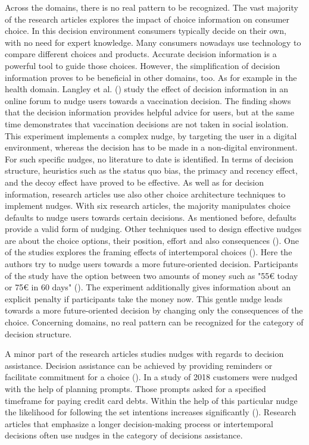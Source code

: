 Across the domains, there is no real pattern to be recognized. The vast majority of the research articles explores the impact of choice information on consumer choice. In this decision environment consumers typically decide on their own, with no need for expert knowledge. Many consumers nowadays use technology to compare different choices and products. Accurate decision information is a powerful tool to guide those choices. 
However, the simplification of decision information proves to be beneficial in other domains, too. As for example in the health domain. Langley et al. (\citeyear{langley_should_2015}) study the effect of decision information in an online forum to nudge users towards a vaccination decision. The finding shows that the decision information provides helpful advice for users, but at the same time demonstrates that vaccination decisions are not taken in social isolation. This experiment implements a complex nudge, by targeting the user in a digital environment, whereas the decision has to be made in a non-digital environment. For such specific nudges, no literature to date is identified.
In terms of decision structure, heuristics such as the status quo bias, the primacy and recency effect, and the decoy effect have proved to be effective. As well as for decision information, research articles use also other choice architecture techniques to implement nudges. With six research articles, the majority manipulates choice defaults to nudge users towards certain decisions. As mentioned before, defaults provide a valid form of nudging. Other techniques used to design effective nudges are about the choice options, their position, effort and also consequences (\cite{munscher_review_2016}). One of the studies explores the framing effects of intertemporal choices (\cite{faralla_framing_2017}). Here the authors try to nudge users towards a more future-oriented decision. Participants of the study have the option between two amounts of money such as "55€ today or 75€ in 60 days" (\cite[p.13]{faralla_framing_2017}). The experiment additionally gives information about an explicit penalty if participants take the money now. This gentle nudge leads towards a more future-oriented decision by changing only the consequences of the choice. Concerning domains, no real pattern can be recognized for the category of decision structure.

A minor part of the research articles studies nudges with regards to decision assistance. Decision assistance can be achieved by providing reminders or facilitate commitment for a choice (\cite{munscher_review_2016}). In a study of 2018 customers were nudged with the help of planning prompts. Those prompts asked for a specified timeframe for paying credit card debts. Within the help of this particular nudge the likelihood for following the set intentions increases significantly (\cite{mazar_if_2018}).
Research articles that emphasize a longer decision-making process or intertemporal decisions often use nudges in the category of decisions assistance.

